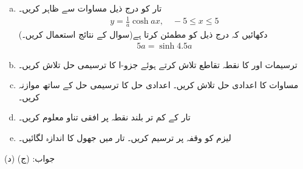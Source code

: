 \begin{enumerate}[a.]
\item
تار کو درج ذیل مساوات سے ظاہر کریں۔
\begin{align*}
y=\frac{1}{a}\cosh ax,\quad -5\le x\le 5
\end{align*}
دکھائیں کہ  درج ذیل کو مطمئن کرتا ہے(سوال  کے نتائج استعمال کریں۔)
\begin{align}\label{مساوات_ماورائی_لیزم}
5a=\sinh 4.5a
\end{align}
\item
 ترسیمات  اور   کا نقطہ تقاطع تلاش کرتے ہوئے جزو-ا کا ترسیمی حل تلاش کریں۔
\item
مساوات  کا اعدادی حل تلاش کریں۔ اعدادی حل کا ترسیمی حل کے ساتھ موازنہ کریں۔
\item
تار کے کم تر بلند نقطہ پر افقی تناو معلوم کریں۔
\item
لیزم  کو وقفہ  پر ترسیم کریں۔ تار میں جھول کا اندازہ لگائیں۔
\end{enumerate}
جواب:\quad
(ج)  (د) 
